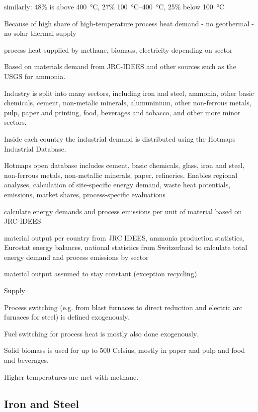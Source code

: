  similarly:
48\% is above \SI{400}{\celsius}, 27\% \SIrange{100}{400}{\celsius}, 25\% below \SI{100}{\celsius}

Because of high share of high-temperature process heat demand
- no geothermal
- no solar thermal supply

process heat supplied by methane, biomass, electricity depending on sector

Based on materials demand from JRC-IDEES and other sources such as the USGS for
ammonia.

Industry is split into many sectors, including iron and steel, ammonia, other
basic chemicals, cement, non-metalic minerals, alumuninium, other non-ferrous
metals, pulp, paper and printing, food, beverages and tobacco, and other more
minor sectors.

Inside each country the industrial demand is distributed using the Hotmaps
Industrial Database.

Hotmaps open database includes cement, basic chemicals, glass, iron and steel, non-ferrous metals,
non-metallic minerals, paper, refineries. Enables regional analyses, calculation of
site-specific energy demand, waste heat potentials, emissions, market shares,
process-specific evaluations

calculate energy demands and process emissions per unit of material based on JRC-IDEES

material output per country from JRC IDEES, ammonia production statistics,
Eurostat energy balances, national statistics from Switzerland to calculate total energy demand
and process emissions by sector

material output assumed to stay constant (exception recycling)

Supply

Process switching (e.g. from blast furnaces to direct reduction and electric arc
furnaces for steel) is defined exogenously.

Fuel switching for process heat is mostly also done exogenously.

Solid biomass is used for up to 500 Celsius, mostly in paper and pulp and food
and beverages.

Higher temperatures are met with methane.


\subsection{Iron and Steel}
\label{sec:si:industry:steel}

